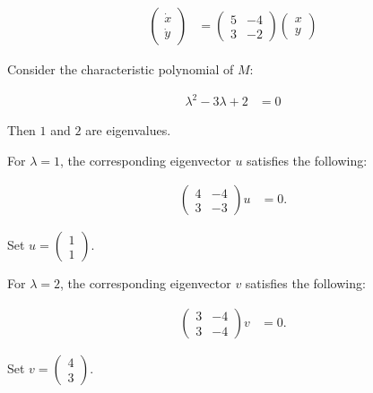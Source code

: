 \documentclass[12pt,letterpaper]{article}
\begin{document}
\begin{enumerate}[label=(\alph*)]
	      \begin{align}
		      \begin{pmatrix}
			      \dot{x} \\
			      \dot{y}
		      \end{pmatrix} & = \begin{pmatrix}
			      5 & -4 \\
			      3 & -2
		      \end{pmatrix}
		      \begin{pmatrix}
			      x \\
			      y
		      \end{pmatrix}
	      \end{align}

	      Consider the characteristic polynomial of $M$:

	      \begin{align}
		      \lambda^2 - 3 \lambda + 2 & = 0
	      \end{align}

	      Then $1$ and $2$ are eigenvalues.

	      For $\lambda = 1$, the corresponding eigenvector $u$ satisfies the following:

	      \begin{align}
		      \begin{pmatrix}
			      4 & -4 \\
			      3 & -3
		      \end{pmatrix}u & =
		      0.
	      \end{align}

	      Set $u=\begin{pmatrix}
			      1 \\
			      1
		      \end{pmatrix}$.


	      For $\lambda = 2$, the corresponding eigenvector $v$ satisfies the following:

	      \begin{align}
		      \begin{pmatrix}
			      3 & -4 \\
			      3 & -4
		      \end{pmatrix}v & =
		      0.
	      \end{align}

	      Set $v=\begin{pmatrix}
			      4 \\
			      3
		      \end{pmatrix}$.


\end{enumerate}
\end{document}
